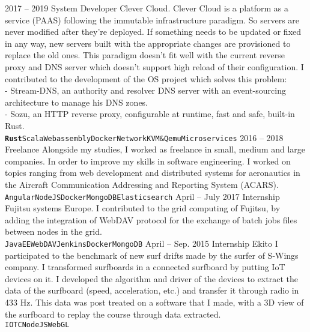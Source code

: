 \documentclass[9pt]{developercv}
\begin{document}


\begin{entrylist}
	\entry
		{2017 -- 2019}
		{System Developer}
		{Clever Cloud.}
		{
			Clever Cloud is a platform as a service (PAAS) following the immutable infrastructure paradigm. So
			servers are never modified after they’re deployed. If something needs to be updated or fixed in any way,
			new servers built with the appropriate changes are provisioned to replace the old ones. This paradigm
			doesn’t fit well with the current reverse proxy and DNS server which doesn’t support high reload of their
			configuration. I contributed to the development of the OS project which solves this problem:\\
			- Stream-DNS, an authority and resolver DNS server with an event-sourcing architecture to manage his DNS zones.\\
			- Sozu, an HTTP reverse proxy, configurable at runtime, fast and safe, built-in Rust.\\
			\textbf{\texttt{Rust}}\slashsep\texttt{Scala}\slashsep\texttt{Webassembly}\slashsep\texttt{Docker}\slashsep\texttt{Network}\slashsep\texttt{KVM\&Qemu}\slashsep\texttt{Microservices}
		}
	\entry
		{2016 -- 2018}
		{Freelance}
		{}
		{
			Alongside my studies, I worked as freelance in small, medium and large companies. In order to improve
			my skills in software engineering. I worked on topics ranging from web development and distributed
			systems for aeronautics in the Aircraft Communication Addressing and Reporting System (ACARS).\\
			\texttt{Angular}\slashsep\texttt{NodeJS}\slashsep\texttt{Docker}\slashsep\texttt{MongoDB}\slashsep\texttt{Elasticsearch}
		}
	\entry
		{April -- July 2017}
		{Internship}
		{Fujitsu systems Europe.}
		{
			I contributed to the grid computing of Fujitsu, by adding the integration of WebDAV protocol for the
			exchange of batch jobs files between nodes in the grid.\\
			\texttt{JavaEE}\slashsep\texttt{WebDAV}\slashsep\texttt{Jenkins}\slashsep\texttt{Docker}\slashsep\texttt{MongoDB}
		}
	\entry
		{April -- Sep. 2015}
		{Internship}
		{Ekito}
		{
			I participated to the benchmark of new surf drifts made by the surfer of S-Wings company. I transformed
			surfboards in a connected surfboard by putting IoT devices on it. I developed the algorithm and driver
			of the devices to extract the data of the surfboard (speed, acceleration, etc.) and transfer it through
			radio in 433 Hz. This data was post treated on a software that I made, with a 3D view of the surfboard
			to replay the course through data extracted.\\
			\texttt{IOT}\slashsep\texttt{C}\slashsep\texttt{NodeJS}\slashsep\texttt{WebGL}
		}
\end{entrylist}
\end{document}
